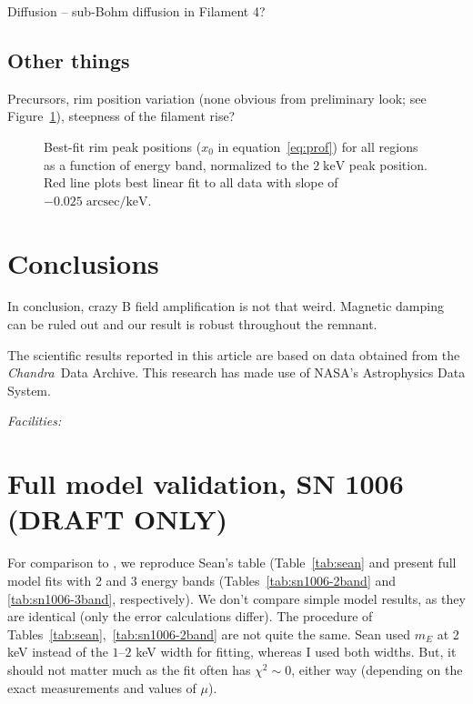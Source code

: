 \documentclass[iop, apj, numberedappendix, twocolappendix]{emulateapj}
\newcommand*{\mt}{\mathrm}
\newcommand*{\unit}[1]{\;\mt{#1}}  %
\newcommand*{\Chandra}{\textit{Chandra}\ }
\begin{document}
Diffusion -- sub-Bohm diffusion in Filament 4?

\subsection{Other things}

Precursors, rim position variation (none obvious from preliminary look; see
Figure~\ref{fig:peak-pos}), steepness of the filament rise?

\begin{figure}
    \centering
    \caption{Best-fit rim peak positions ($x_0$ in equation~\eqref{eq:prof})
        for all regions as a function of energy band, normalized to the $2
        \unit{keV}$ peak position.  Red line plots best linear fit to all data
        with slope of $-0.025 \unit{arcsec/keV}$.
        \label{fig:peak-pos}}
\end{figure}

\section{Conclusions}

In conclusion, crazy B field amplification is not that weird.
Magnetic damping can be ruled out and our result is robust throughout the remnant.

\acknowledgments

The scientific results reported in this article are based on data obtained from
the \Chandra Data Archive.
This research has made use of NASA's Astrophysics Data System.

{\it Facilities:} 

\clearpage

\appendix

\setcounter{table}{0}
\renewcommand{\thetable}{A\arabic{table}}
\setcounter{figure}{0}
\renewcommand{\thefigure}{A\arabic{figure}}

\section{Full model validation, SN 1006 (DRAFT ONLY)}

For comparison to , we reproduce Sean's table
(Table~\ref{tab:sean} and present full model fits with 2 and 3 energy bands
(Tables~\ref{tab:sn1006-2band} and \ref{tab:sn1006-3band}, respectively).
We don't compare simple model results, as they are identical (only the error
calculations differ).
The procedure of Tables~\ref{tab:sean},~\ref{tab:sn1006-2band} are not quite
the same.  Sean used $m_E$ at 2 keV instead of the $1$--$2$ keV width for
fitting, whereas I used both widths.  But, it should not matter much as
the fit often has $\chi^2 \sim 0$, either way (depending on the exact
measurements and values of $\mu$).
\end{document}
